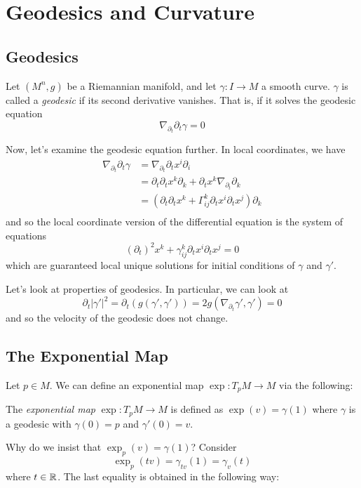 \documentclass[../main.tex]{subfiles}
\begin{document}
\section{Geodesics and Curvature}

\subsection{Geodesics}
\begin{defn}
Let $(M^n,g)$ be a Riemannian manifold, and let $\gamma:I\to M$ a smooth curve.
$\gamma$ is called a {\em geodesic} if its second derivative vanishes. That is,
if it solves the geodesic equation
\[
    \nabla_{\partial_t}\partial_t\gamma = 0
\]
\end{defn}

Now, let's examine the geodesic equation further. In local coordinates, we have
\[
    \begin{aligned}
        \nabla_{\partial_t}\partial_t\gamma &=
        \nabla_{\partial_t}\partial_tx^i\partial_i\\
        &=\partial_t\partial_t x^k\partial_k +
        \partial_tx^k\nabla_{\partial_t}\partial_k\\
        &=(\partial_t\partial_t x^k +
        \Gamma^k_{ij}\partial_tx^i\partial_tx^j)\partial_k\\
    \end{aligned}
\]
and so the local coordinate version of the differential equation is the system
of equations
\[
    (\partial_t)^2x^k + \gamma^k_{ij}\partial_tx^i\partial_tx^j = 0
\]
which are guaranteed local unique solutions for initial conditions of $\gamma$
and $\gamma'$.

Let's look at properties of geodesics. In particular, we can look at
\[
    \partial_t|\gamma'|^2 = \partial_t(g(\gamma',\gamma'))
    = 2g(\nabla_{\partial_t}\gamma',\gamma') = 0
\]
and so the velocity of the geodesic does not change.

\subsection{The Exponential Map}
Let $p\in M$. We can define an exponential map $\exp:T_pM\to M$ via
the following:

\begin{defn}
    The {\em exponential map} $\exp:T_pM\to M$ is defined as
    $\exp(v) = \gamma(1)$ where $\gamma$ is a geodesic with $\gamma(0)=p$ and
    $\gamma'(0)=v$. 
\end{defn}
Why do we insist that $\exp_p(v) = \gamma(1)$? Consider
\[
    \exp_p(tv) = \gamma_{tv}(1) =\gamma_v(t)
\]
where $t\in \mathbb{R}$. The last equality is obtained in the following way:
\end{document}
